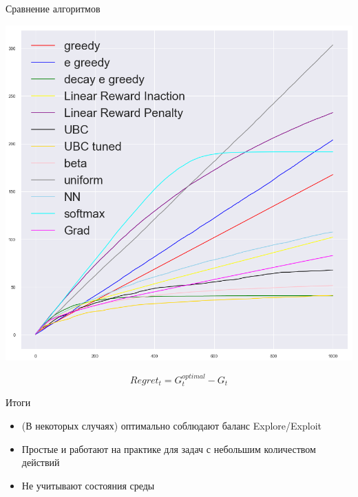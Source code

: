 \documentclass[11pt,aspectratio=169,handout]{beamer}
\begin{document}
\begin{frame}{Сравнение алгоритмов \cite{BANDITS3}}

\begin{center}
\includegraphics[scale=0.2]{images/regret.png}
\end{center}
\[
Regret_t = G_t^{optimal} - G_t
\]

\end{frame}

\begin{frame}{Итоги}

\begin{tcolorbox}[colback=info!5,colframe=info!80,title=]
\begin{itemize}
\item (В некоторых случаях) оптимально соблюдают баланс Explore/Exploit
\item Простые и работают на практике для задач с небольшим количеством действий
\end{itemize}
\end{tcolorbox}

\vfill

\begin{tcolorbox}[colback=warn!5,colframe=warn!80,title=]
\begin{itemize}
\item Не учитывают состояния среды
\end{itemize}
\end{tcolorbox}

\end{frame}
\end{document}
